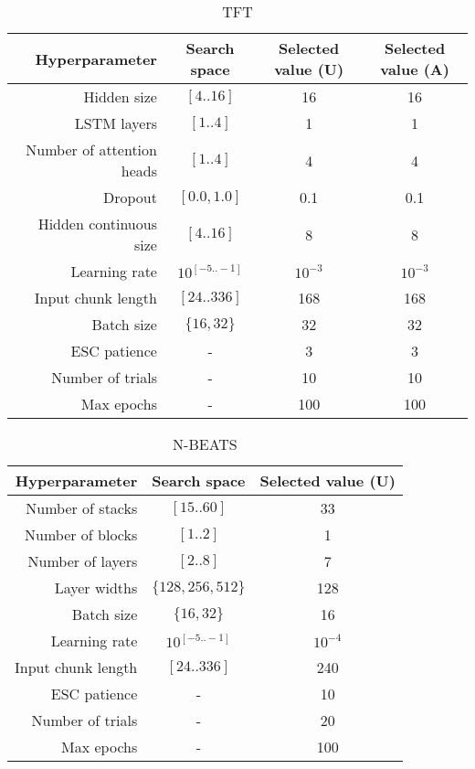 \begin{table}[H]
    \centering
    \caption{TFT}
    \begin{tabular}{|r|c|c|c|}
        \hline
        Hyperparameter & Search space & Selected value (U) & Selected value (A)\\
        \hline
        Hidden size & $[4..16]$ & 16 & 16\\
        LSTM layers & $[1..4]$ & 1 & 1 \\
        Number of attention heads & $[1..4]$ & 4 & 4 \\
        Dropout & $[0.0,1.0]$ & 0.1 & 0.1 \\
        Hidden continuous size & $[4..16]$ & 8 & 8 \\
        Learning rate & $10^{[-5..-1]}$ & $10^{-3}$ & $10^{-3}$\\
        Input chunk length & $[24..336]$ & 168 & 168\\
        Batch size & $\{16,32\}$ & 32 & 32\\
        ESC patience & - & 3 & 3 \\
        Number of trials & - & 10 & 10 \\
        Max epochs & - & 100 & 100 \\
        \hline
    \end{tabular}
\end{table}

\begin{table}[H]
    \centering
    \caption{N-BEATS}
    \begin{tabular}{|r|c|c|}
        \hline
        Hyperparameter & Search space & Selected value (U) \\
        \hline
        Number of stacks & $[15..60]$ & 33 \\
        Number of blocks & $[1..2]$ & 1 \\
        Number of layers & $[2..8]$ & 7 \\
        Layer widths & $\{128,256,512\}$ & 128 \\
        Batch size & $\{16,32\}$ & 16 \\
        Learning rate & $10^{[-5..-1]}$ & $10^{-4}$ \\
        Input chunk length & $[24..336]$ & 240 \\
        ESC patience & - & 10  \\
        Number of trials & - & 20 \\
        Max epochs & - & 100 \\
        \hline
    \end{tabular}
\end{table}
\pagebreak